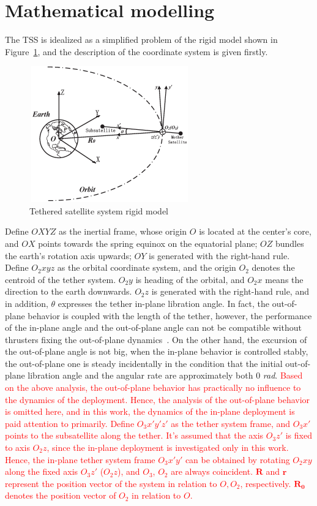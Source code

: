 \documentclass[3p]{elsarticle}
\theoremstyle{plain}
\begin{document}
\section{Mathematical modelling}\label{sec:mm}
The TSS is idealized as a simplified problem of the rigid model shown in Figure~\ref{fig:model}, and the description of the coordinate system is given firstly.
\begin{figure}
\centering
\includegraphics[width=6.94cm,height=5.87cm]{orbit_in_plane.eps}
\caption{Tethered satellite system rigid model}\label{fig:model}
\end{figure}
Define $OXYZ$ as the inertial frame, whose origin $O$ is located at the center's core, and $OX$ points towards the spring equinox on the equatorial plane; $OZ$ bundles the earth's rotation axis upwards; $OY$ is generated with the right-hand rule.
Define $O_2xyz$ as the orbital coordinate system, and the origin $O_2$ denotes the centroid of the tether system. $O_2y$ is heading of the orbital, and $O_2x$ means the direction to the earth downwards. $O_2z$ is generated with the right-hand rule, and in addition, $\theta$ expresses the tether in-plane libration angle. In fact, the out-of-plane behavior is coupled with the length of the tether, however, the performance of the in-plane angle and the  out-of-plane angle can not be compatible without thrusters fixing the out-of-plane dynamics~\cite{Vadali1991Feedback}. On the other hand, the excursion of the out-of-plane angle is not big, when the in-plane behavior is controlled stably, the out-of-plane one is steady incidentally in the condition that the initial out-of-plane libration angle and the angular rate are approximately both 0 \textit{rad}. \textcolor{red}{Based on the above analysis, the out-of-plane behavior has practically no influence to the dynamics of the deployment. Hence, the analysis of the out-of-plane behavior is omitted here, and in this work, the dynamics of the in-plane deployment is paid attention to primarily. Define $O_3x'y'z'$ as the tether system frame, and $O_3x'$ points to the subsatellite along the tether. It's assumed that the axis $O_3z'$ is fixed to axis $O_2z$, since the in-plane deployment is investigated only in this work. Hence, the in-plane tether system frame $O_3x'y'$ can be obtained by rotating $O_2xy$ along the fixed axis $O_3z'$ ($O_2z$), and $O_3$, $O_2$ are always coincident. $\bm{R}$ and $\bm{r}$ represent the position vector of the system in relation to $O,O_2$, respectively. $\bm{R_0}$ denotes the position vector of $O_2$ in relation to $O$.}\par
\end{document}
